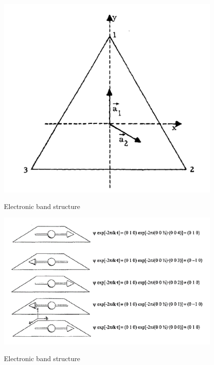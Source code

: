 \documentclass[11pt,edeposit,draftthesis]{uiucthesis2020}
\begin{document}
\begin{mainmatter}
\begin{figure}
\centering\includegraphics[width=0.5\columnwidth]{figures/ch3/C3v_a1_a2.png} \\
\caption{\label{fig:C3v_a1_a2}
Electronic band structure
}
\end{figure}

\begin{figure}
\centering\includegraphics[width=\columnwidth]{figures/ch3/propagation_vector.png} \\
\caption{\label{fig:propagation_vector}
Electronic band structure
}
\end{figure}


\end{mainmatter}
\end{document}
